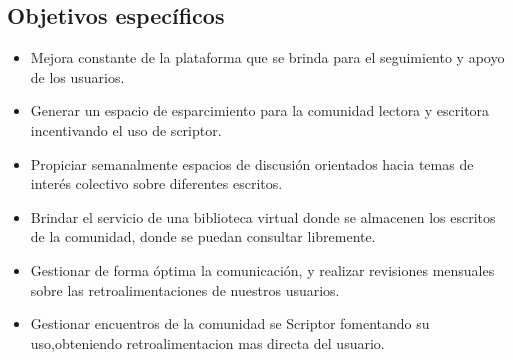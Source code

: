 \subsection{Objetivos específicos}
\begin{itemize}
	\item Mejora constante de la plataforma que se brinda para el seguimiento y apoyo de los usuarios.
	
	\item Generar un espacio de esparcimiento para la comunidad lectora y escritora incentivando el uso de scriptor.
	
	\item Propiciar semanalmente espacios de discusión orientados hacia temas de interés colectivo sobre diferentes escritos. 
	
	\item Brindar el servicio de una biblioteca virtual donde se almacenen los escritos de la comunidad, donde se puedan consultar libremente.
	
	\item Gestionar de forma óptima la comunicación, y realizar revisiones mensuales sobre las retroalimentaciones de nuestros usuarios.
	
	\item Gestionar encuentros de la comunidad se Scriptor fomentando su uso,obteniendo retroalimentacion mas directa del usuario.
	
\end{itemize}

